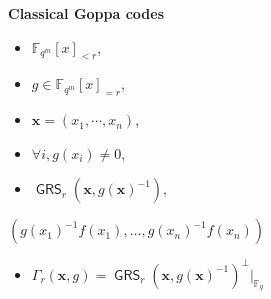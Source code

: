 \documentclass[
10pt, %
%
aspectratio=169, %
]{beamer}
\theoremstyle{plain}%
\theoremstyle{definition}
\theoremstyle{remark}
\newcommand{\fqm}{\mathbb{F}_{q^m}}
\newcommand{\fq}{\mathbb{F}_{q}}
\newcommand{\GRS}{\operatorname{\mathsf{GRS}}}
\begin{document}
\begin{frame}
\begin{columns}[c]
\begin{column}{0.3\textwidth}
		\textcolor{ballblue}{\textbf{Classical Goppa codes}}
		\vspace{1em}
		\begin{itemize}
			\item $\fqm[x]_{<r}$,
			\vspace{1em}
			\item $g \in \fqm[x]_{= r}$,
			\vspace{0.5em}
			\item $\mathbf{x}=(x_1,\cdots,x_n)$,
			\vspace{0.5em}
			\item $\forall i, g(x_i)\neq 0$,
			\vspace{0.5em}
			\item $\GRS_r(\mathbf{x}, g(\mathbf{x})^{-1})$,
		\end{itemize}
	 \textcolor{ballblue}{$(g(x_1)^{-1}f(x_1),\dots,g(x_n)^{-1}f(x_n)) $}
	 \begin{itemize}
	 	\item $\Gamma_r(\mathbf{x},g)= \GRS_r(\mathbf{x},g(\mathbf{x})^{-1})^\perp|_{\fq}$
	 \end{itemize}
 \vspace{3em}
	\end{column}
\end{columns}
\end{frame}
\end{document}
